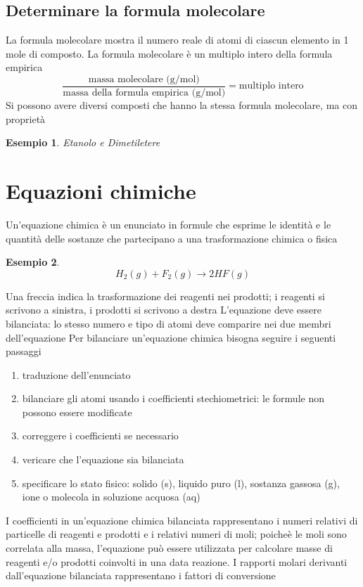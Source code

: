 \documentclass[a4paper,11pt]{report}
\newtheorem*{es}{Esempio}
\begin{document}
\subsection*{Determinare la formula molecolare}
La formula molecolare mostra il numero reale di atomi di ciascun elemento in 1 mole di composto. La formula molecolare è un multiplo intero della formula empirica
\begin{equation*}
	\frac{\text{massa molecolare (g/mol)}}{\text{massa della formula empirica (g/mol)}} = \text{multiplo intero}
\end{equation*}
Si possono avere diversi composti che hanno la stessa formula molecolare, ma con proprietà
\begin{es}
	Etanolo e Dimetiletere
\end{es}

\section{Equazioni chimiche}
Un'equazione chimica è un enunciato in formule che esprime le identità e le quantità delle sostanze che partecipano a una trasformazione chimica o fisica

\begin{es}
	\begin{equation*}
		H_2(g) + F_2(g) \longrightarrow 2HF(g)
	\end{equation*}
\end{es}

\noindent Una freccia indica la trasformazione dei reagenti nei prodotti; i reagenti si scrivono a sinistra, i prodotti si scrivono a destra \newline
L'equazione deve essere bilanciata: lo stesso numero e tipo di atomi deve comparire nei due membri dell'equazione \newline
Per bilanciare un'equazione chimica bisogna seguire i seguenti passaggi
\begin{enumerate}
	\item traduzione dell'enunciato
	\item bilanciare gli atomi usando i coefficienti stechiometrici: le formule non possono essere modificate
	\item correggere i coefficienti se necessario
	\item vericare che l'equazione sia bilanciata
	\item specificare lo stato fisico: solido (s), liquido puro (l), sostanza gassosa (g), ione o molecola in soluzione acquosa (aq)
\end{enumerate}
I coefficienti in un'equazione chimica bilanciata rappresentano i numeri relativi di particelle di reagenti e prodotti e i relativi numeri di moli; poicheè le moli sono correlata alla massa, l'equazione può essere utilizzata per calcolare masse di reagenti e/o prodotti coinvolti in una data reazione. I rapporti molari derivanti dall'equazione bilanciata rappresentano i fattori di conversione
\end{document}
